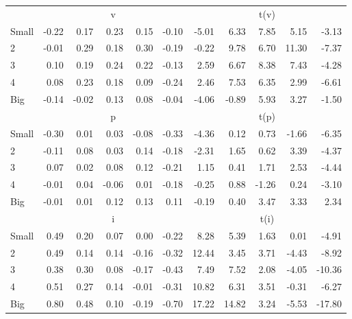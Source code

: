 \begin{table}[!ht]
\begin{tabular}{lrrrrrrrrrr}
  
     & \multicolumn{5}{c}{v} & \multicolumn{5}{c}{t(v)}   \\
     \cmidrule(r){2-6} \cmidrule(r){7-11} 
    Small  & -0.22  & 0.17  & 0.23  & 0.15  & -0.10  & -5.01  & 6.33  & 7.85  & 5.15  & -3.13   \\
    2  & -0.01  & 0.29  & 0.18  & 0.30  & -0.19  & -0.22  & 9.78  & 6.70  & 11.30  & -7.37   \\
    3  & 0.10  & 0.19  & 0.24  & 0.22  & -0.13  & 2.59  & 6.67  & 8.38  & 7.43  & -4.28   \\
    4  & 0.08  & 0.23  & 0.18  & 0.09  & -0.24  & 2.46  & 7.53  & 6.35  & 2.99  & -6.61   \\
    Big  & -0.14  & -0.02  & 0.13  & 0.08  & -0.04  & -4.06  & -0.89  & 5.93  & 3.27  & -1.50   \\
    
  
     & \multicolumn{5}{c}{p} & \multicolumn{5}{c}{t(p)}   \\
     \cmidrule(r){2-6} \cmidrule(r){7-11} 
    Small  & -0.30  & 0.01  & 0.03  & -0.08  & -0.33  & -4.36  & 0.12  & 0.73  & -1.66  & -6.35   \\
    2  & -0.11  & 0.08  & 0.03  & 0.14  & -0.18  & -2.31  & 1.65  & 0.62  & 3.39  & -4.37   \\
    3  & 0.07  & 0.02  & 0.08  & 0.12  & -0.21  & 1.15  & 0.41  & 1.71  & 2.53  & -4.44   \\
    4  & -0.01  & 0.04  & -0.06  & 0.01  & -0.18  & -0.25  & 0.88  & -1.26  & 0.24  & -3.10   \\
    Big  & -0.01  & 0.01  & 0.12  & 0.13  & 0.11  & -0.19  & 0.40  & 3.47  & 3.33  & 2.34   \\
    
  
     & \multicolumn{5}{c}{i} & \multicolumn{5}{c}{t(i)}   \\
     \cmidrule(r){2-6} \cmidrule(r){7-11} 
    Small  & 0.49  & 0.20  & 0.07  & 0.00  & -0.22  & 8.28  & 5.39  & 1.63  & 0.01  & -4.91   \\
    2  & 0.49  & 0.14  & 0.14  & -0.16  & -0.32  & 12.44  & 3.45  & 3.71  & -4.43  & -8.92   \\
    3  & 0.38  & 0.30  & 0.08  & -0.17  & -0.43  & 7.49  & 7.52  & 2.08  & -4.05  & -10.36   \\
    4  & 0.51  & 0.27  & 0.14  & -0.01  & -0.31  & 10.82  & 6.31  & 3.51  & -0.31  & -6.27   \\
    Big  & 0.80  & 0.48  & 0.10  & -0.19  & -0.70  & 17.22  & 14.82  & 3.24  & -5.53  & -17.80   \\
    

\end{tabular}
\end{table}

